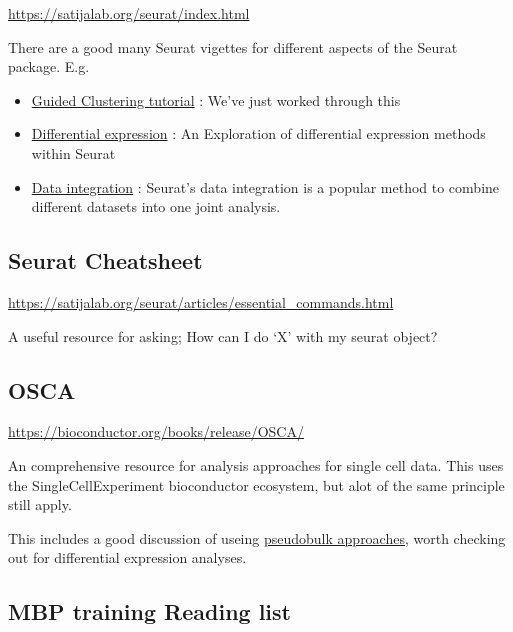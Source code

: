 \documentclass[
]{book}
\providecommand{\tightlist}{%
  \setlength{\itemsep}{0pt}\setlength{\parskip}{0pt}}
\begin{document}
\url{https://satijalab.org/seurat/index.html}

There are a good many Seurat vigettes for different aspects of the Seurat package. E.g.

\begin{itemize}
\tightlist
\item
  \href{https://satijalab.org/seurat/articles/pbmc3k_tutorial.html}{Guided Clustering tutorial} : We've just worked through this
\item
  \href{https://satijalab.org/seurat/archive/v3.1/de_vignette.html}{Differential expression} : An Exploration of differential expression methods within Seurat
\item
  \href{https://satijalab.org/seurat/articles/integration_introduction.html}{Data integration} : Seurat's data integration is a popular method to combine different datasets into one joint analysis.
\end{itemize}

\hypertarget{seurat-cheatsheet}{%
\subsection*{Seurat Cheatsheet}\label{seurat-cheatsheet}}

\url{https://satijalab.org/seurat/articles/essential_commands.html}

A useful resource for asking; How can I do `X' with my seurat object?

\hypertarget{osca}{%
\subsection*{OSCA}\label{osca}}

\url{https://bioconductor.org/books/release/OSCA/}

An comprehensive resource for analysis approaches for single cell data.
This uses the SingleCellExperiment bioconductor ecosystem, but alot of the same principle still apply.

This includes a good discussion of useing \href{http://bioconductor.org/books/3.15/OSCA.multisample/multi-sample-comparisons.html\#creating-pseudo-bulk-samples}{pseudobulk approaches}, worth checking out for differential expression analyses.

\hypertarget{mbp-training-reading-list}{%
\subsection*{MBP training Reading list}\label{mbp-training-reading-list}}
\end{document}
